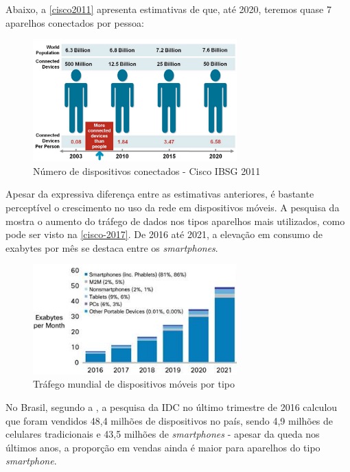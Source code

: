 Abaixo, a \autoref{cisco2011} apresenta estimativas de que, até 2020, teremos quase 7 aparelhos conectados por pessoa:

\begin{figure}[htb]
  \caption{\label{cisco2011}Número de dispositivos conectados - Cisco IBSG 2011}
  \begin{center}
    \includegraphics[width=0.70\textwidth]{img/cisco-2011.png}
  \end{center}
\end{figure}

Apesar da expressiva diferença entre as estimativas anteriores, é bastante perceptível o crescimento no uso da rede em dispositivos móveis. A pesquisa da  mostra o aumento do tráfego de dados nos tipos aparelhos mais utilizados, como pode ser visto na \autoref{cisco-2017}. De 2016 até 2021, a elevação em consumo de exabytes por mês se destaca entre os \emph{smartphones}.

\begin{figure}[htb]
  \caption{\label{cisco-2017}Tráfego mundial de dispositivos móveis por tipo}
  \begin{center}
    \includegraphics[width=0.70\textwidth]{img/cisco-2017.png}
  \end{center}
\end{figure}

No Brasil, segundo a , a pesquisa da IDC no último trimestre de 2016 calculou que foram vendidos 48,4 milhões de dispositivos no país, sendo 4,9 milhões de celulares tradicionais e 43,5 milhões de \emph{smartphones} - apesar da queda nos últimos anos, a proporção em vendas ainda é maior para aparelhos do tipo \emph{smartphone}.

